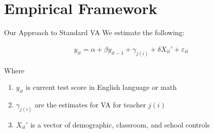 \documentclass[11pt]{beamer}
\begin{document}

\section{Empirical Framework}


\begin{frame}{Our Approach to Standard VA}
    We estimate the following:
    
    \begin{gather}
        y_{it} = \alpha + \beta y_{it-1} + \gamma_{j(i)} + \delta X_{it}' + \varepsilon_{it}
    \end{gather}
    
    Where
    \begin{enumerate}
        \item $y_{it}$ is current test score in English language or math
        \item $\gamma_{j(i)}$ are the estimates for VA for teacher $j(i)$
        \item $X_{it}'$ is a vector of demographic, classroom, and school controls
    \end{enumerate}
    
\end{frame}


\end{document}
